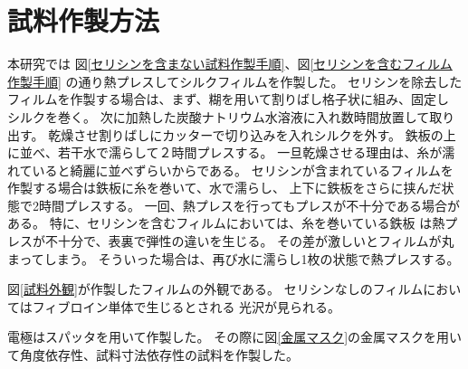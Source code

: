 \documentclass[dvipdfmx,12pt,a4paper]{jreport}
\begin{document}
		\section{試料作製方法}
		本研究では
		図\ref{セリシンを含まない試料作製手順}、図\ref{セリシンを含むフィルム作製手順}
		の通り熱プレスしてシルクフィルムを作製した。
		セリシンを除去したフィルムを作製する場合は、まず、糊を用いて割りばし格子状に組み、固定し
		シルクを巻く。
		次に加熱した炭酸ナトリウム水溶液に入れ数時間放置して取り出す。
		乾燥させ割りばしにカッターで切り込みを入れシルクを外す。
		鉄板の上に並べ、若干水で濡らして２時間プレスする。
		一旦乾燥させる理由は、糸が濡れていると綺麗に並べずらいからである。
		セリシンが含まれているフィルムを作製する場合は鉄板に糸を巻いて、水で濡らし、
		上下に鉄板をさらに挟んだ状態で2時間プレスする。
		一回、熱プレスを行ってもプレスが不十分である場合がある。
		特に、セリシンを含むフィルムにおいては、糸を巻いている鉄板
		は熱プレスが不十分で、表裏で弾性の違いを生じる。
		その差が激しいとフィルムが丸まってしまう。
		そういった場合は、再び水に濡らし1枚の状態で熱プレスする。

		図\ref{試料外観}が作製したフィルムの外観である。
		セリシンなしのフィルムにおいてはフィブロイン単体で生じるとされる
		光沢が見られる。

		電極はスパッタを用いて作製した。
		その際に図\ref{金属マスク}の金属マスクを用いて角度依存性、試料寸法依存性の試料を作製した。
\end{document}
